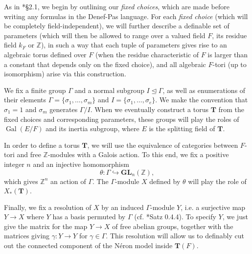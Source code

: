 \documentclass{amsart}
\newcommand{\Z}{{\mathbb Z}}
\newcommand{\GL}{\mathbf {GL}}
\newcommand{\bT}{\mathbf {T}}
\newcommand\spl{\mathrm{spl}}
\DeclareMathOperator{\Gal}{Gal}
\theoremstyle{plain}
\theoremstyle{definition}
\begin{document}
As in \cite{hales:transfert}*{\S 2.1}, we begin by outlining our \emph{fixed choices}, which are made before writing any formulas in the Denef-Pas language.  
For each \emph{fixed choice} (which will be completely field-independent), we will further describe a definable set of parameters (which will then be allowed to range over a valued field $F$, its residue field $k_F$ or $\Z$), in such a way that each tuple of parameters gives rise to an algebraic torus defined over $F$ (when the residue characteristic of $F$ is larger than a constant that depends only on the fixed choice), and all algebraic $F$-tori (up to isomorphism)  arise via this construction.

We fix a finite group $\Gamma$ and a normal subgroup $I \unlhd \Gamma$, as well as enumerations of their elements $\Gamma = \{\sigma_1, \dots, \sigma_m\}$ and $I = \{\sigma_1, \dots, \sigma_e\}$.  We make the convention that $\sigma_1 = 1$ and $\sigma_m$ generates $\Gamma / I$.  When we eventually construct a torus $\bT$ from the fixed choices and corresponding parameters, these groups will play the roles of $\Gal(E/F)$ and its inertia subgroup, where $E$ is the splitting field of $\bT$.

In order to define a torus $\bT$, we will use the equivalence of categories between $F$-tori and free $\Z$-modules with a Galois action.  To this end, we fix a positive integer $n$ and an injective homomorphism
\begin{equation} \label{eq:theta}
\theta : \Gamma \hookrightarrow \GL_n(\Z),
\end{equation}
which gives $\Z^n$ an action of $\Gamma$.  The $\Gamma$-module $X$ defined by $\theta$ will play the role of $X_\ast(\bT)$.

Finally, we fix a resolution of $X$ by an induced $\Gamma$-module $Y$, i.e. a surjective map $Y \to X$ where $Y$ has a basis permuted by $\Gamma$ (cf. \cite{brahm:thesis}*{Satz 0.4.4}).  To specify $Y$, we just give the matrix for the map $Y \to X$ of free abelian groups, together with the matrices giving $\gamma : Y \to Y$ for $\gamma \in \Gamma$. This resolution will allow us to definably cut out the connected component of the N\'eron model inside $\bT(F)$.

\end{document}
